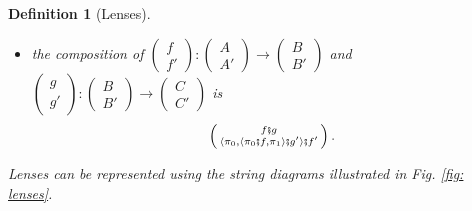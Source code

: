 \documentclass[11pt,a4paper,openright,twoside]{report}
\newcounter{mycounter}
\theoremstyle{plain}
\newtheorem{definition}[mycounter]{Definition}
\theoremstyle{definition}
\begin{document}
\begin{definition}[Lenses]
\begin{itemize}
    \item the composition of $\left(\begin{smallmatrix} f \\ f' \end{smallmatrix}\right): \left(\begin{smallmatrix} A \\ A' \end{smallmatrix}\right) \to \left(\begin{smallmatrix} B \\ B' \end{smallmatrix}\right)$ and $\left(\begin{smallmatrix} g \\ g' \end{smallmatrix}\right): \left(\begin{smallmatrix} B \\ B' \end{smallmatrix}\right) \to \left(\begin{smallmatrix} C \\ C' \end{smallmatrix}\right)$ is
    \[\left(\begin{smallmatrix} f \fatsemi g \\ \langle \pi_0, \langle \pi_0 \fatsemi f, \pi_1 \rangle \fatsemi g' \rangle \fatsemi f' \end{smallmatrix}\right).\]
  \end{itemize}
  Lenses can be represented using the string diagrams illustrated in \textit{Fig. \ref{fig: lenses}}.
\end{definition}
\end{document}
